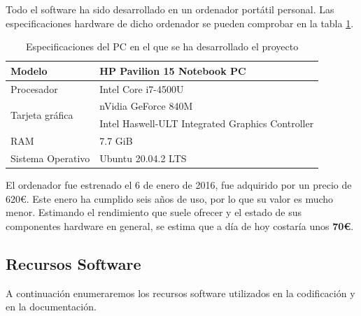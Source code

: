 Todo el software ha sido desarrollado en un ordenador portátil personal. Las especificaciones hardware de dicho ordenador se pueden comprobar en la tabla \ref{tabla:especificaciones-PC}.
\begin{table}[ht]
    \centering
    \begin{tabular}{ll}
    \hline
    Modelo                           & HP Pavilion 15 Notebook PC                       \\ \hline
    Procesador                       & Intel Core i7-4500U                              \\ \hline
    \multirow{2}{*}{Tarjeta gráfica} & nVidia GeForce 840M                              \\
                                     & Intel Haswell-ULT Integrated Graphics Controller \\ \hline
    RAM                              & 7.7 GiB                                          \\ \hline
    Sistema Operativo                & Ubuntu 20.04.2 LTS                               \\ \hline
    \end{tabular}
    \caption{Especificaciones del PC en el que se ha desarrollado el proyecto}
    \label{tabla:especificaciones-PC}
    \end{table}


El ordenador fue estrenado el 6 de enero de 2016, fue adquirido por un precio de 620€. Este enero ha cumplido seis años de uso, por lo que su valor es mucho menor. Estimando el rendimiento que suele ofrecer y el estado de sus componentes hardware en general, se estima que a día de hoy costaría unos \textbf{70€}.

\subsection*{Recursos Software}

A continuación enumeraremos los recursos software utilizados en la codificación y en la documentación.

